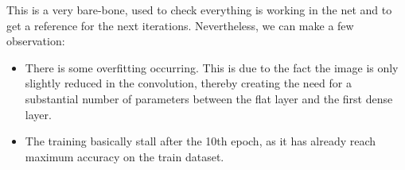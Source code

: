 This is a very bare-bone, used to check everything is working in the net and to get a reference for the next iterations. Nevertheless, we can make a few observation:
\begin{itemize}
\item There is some overfitting occurring. This is due to the fact the image is only slightly reduced in the convolution, thereby creating the need for a substantial number of parameters between the flat layer and the first dense layer.
\item The training basically stall after the 10th epoch, as it has already reach maximum accuracy on the train dataset.
\end{itemize}

